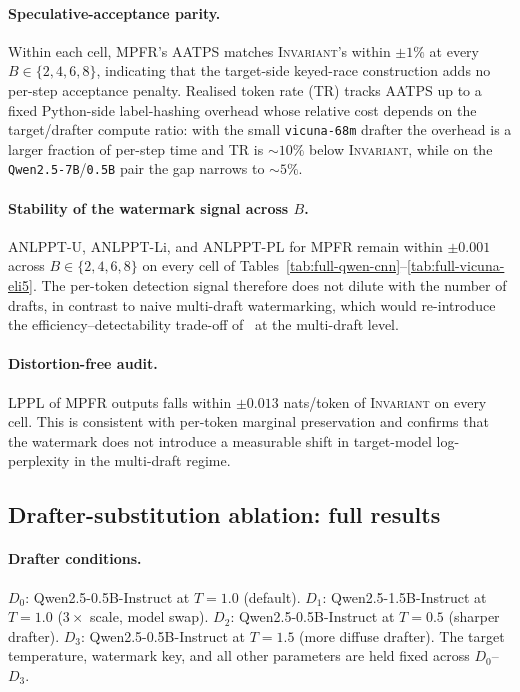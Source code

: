 \paragraph{Speculative-acceptance parity.}
Within each cell, \textsc{MPFR}'s AATPS matches \textsc{Invariant}'s within
$\pm 1\%$ at every $B\in\{2,4,6,8\}$, indicating that the target-side keyed-race
construction adds no per-step acceptance penalty. Realised token rate (TR)
tracks AATPS up to a fixed Python-side label-hashing overhead whose relative
cost depends on the target/drafter compute ratio: with the small
\texttt{vicuna-68m} drafter the overhead is a larger fraction of per-step time
and TR is $\sim\!10\%$ below \textsc{Invariant}, while on the
\texttt{Qwen2.5-7B}/\texttt{0.5B} pair the gap narrows to $\sim\!5\%$.

\paragraph{Stability of the watermark signal across $B$.}
ANLPPT-U, ANLPPT-Li, and ANLPPT-PL for \textsc{MPFR} remain within $\pm 0.001$
across $B\in\{2,4,6,8\}$ on every cell of
Tables~\ref{tab:full-qwen-cnn}--\ref{tab:full-vicuna-eli5}. The per-token
detection signal therefore does not dilute with the number of drafts, in
contrast to naive multi-draft watermarking, which would re-introduce the
efficiency--detectability trade-off of~\citet{hu2024inevitable} at the
multi-draft level.

\paragraph{Distortion-free audit.}
LPPL of \textsc{MPFR} outputs falls within $\pm 0.013$ nats/token of
\textsc{Invariant} on every cell. This is consistent with per-token marginal
preservation and confirms that the watermark does not introduce a measurable
shift in target-model log-perplexity in the multi-draft regime.


\subsection{Drafter-substitution ablation: full results}
\label{app:ablation}

\paragraph{Drafter conditions.}
$D_0$: Qwen2.5-0.5B-Instruct at $T{=}1.0$ (default).
$D_1$: Qwen2.5-1.5B-Instruct at $T{=}1.0$ ($3{\times}$ scale, model swap).
$D_2$: Qwen2.5-0.5B-Instruct at $T{=}0.5$ (sharper drafter).
$D_3$: Qwen2.5-0.5B-Instruct at $T{=}1.5$ (more diffuse drafter).
The target temperature, watermark key, and all other parameters are held fixed
across $D_0$--$D_3$.

